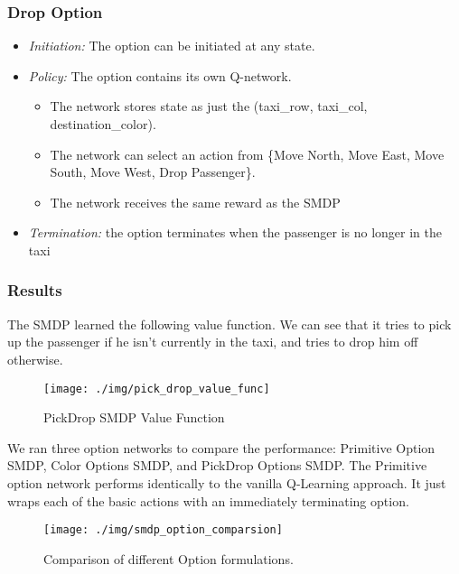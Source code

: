 \documentclass[A4]{article}
\begin{document}
    \subsubsection{Drop Option}
    \begin{itemize}
        \item \emph{Initiation:} The option can be initiated at any state.
        \item \emph{Policy:} The option contains its own Q-network.
        \begin{itemize}
            \item The network stores state as just the (taxi\_row, taxi\_col, destination\_color).
            \item The network can select an action from \{Move North, Move East, Move South, Move West, Drop Passenger\}.
            \item The network receives the same reward as the SMDP
        \end{itemize}
        \item \emph{Termination:} the option terminates when the passenger is no longer in the taxi
    \end{itemize}

    \subsubsection{Results}
    The SMDP learned the following value function.
    We can see that it tries to pick up the passenger if he isn't currently in the taxi, and tries to drop him off otherwise.

    \begin{figure}[H]
        \centering
        \texttt{[image: ./img/pick\_drop\_value\_func]}
        \caption{PickDrop SMDP Value Function}
        \label{fig:pick_drop_value_func}
    \end{figure}

    \noindent We ran three option networks to compare the performance: Primitive Option SMDP, Color Options SMDP, and PickDrop Options SMDP.
    The Primitive option network performs identically to the vanilla Q-Learning approach.
    It just wraps each of the basic actions with an immediately terminating option.
    \begin{figure}[H]
        \centering
        \texttt{[image: ./img/smdp\_option\_comparsion]}
        \caption{Comparison of different Option formulations.}
        \label{fig:smdp_option_Comparison}
    \end{figure}
\end{document}
